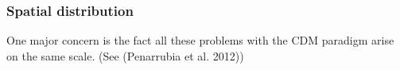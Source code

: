 \documentclass[paper=a4, fontsize=11pt]{scrartcl} %
\numberwithin{equation}{section} %
\numberwithin{figure}{section} %
\numberwithin{table}{section} %
\begin{document}
\subsubsection{Spatial distribution}

One major concern is the fact all these problems with the CDM paradigm arise on the same scale. (See ({Penarrubia et al. 2012}))


\end{document}

